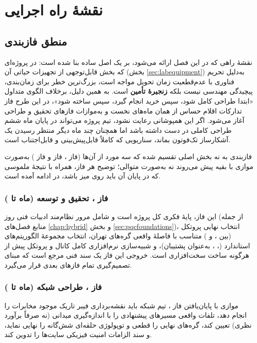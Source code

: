 \chapter{نقشهٔ راه اجرایی}
\label{chap:roadmap}

\section{منطق فازبندی}

نقشهٔ راهی که در این فصل ارائه می‌شود، بر یک اصل ساده بنا شده است: در پروژه‌ای که بخش قابل‌توجهی از تجهیزات حیاتی آن (بخش \ref{sec:labequipment}) به‌دلیل تحریم فناوری با عدم‌قطعیت زمان تحویل مواجه است، بزرگ‌ترین خطر برای زمان‌بندی، پیچیدگی مهندسی نیست بلکه \textbf{زنجیرهٔ تأمین} است. به همین دلیل، برخلاف الگوی متداول «ابتدا طراحی کامل شود، سپس خرید انجام گیرد، سپس ساخته شود»، در این طرح فاز تدارکات اقلام حساس از همان ماه‌های نخست و به‌موازات فازهای تحقیق و طراحی آغاز می‌شود. اگر این همپوشانی رعایت نشود، تیم پروژه می‌تواند در پایان ماه ششم طراحی کاملی در دست داشته باشد اما همچنان چند ماه دیگر منتظر رسیدن یک آشکارساز تک‌فوتون بماند، سناریویی که کاملاً قابل‌پیش‌بینی و قابل‌اجتناب است.

فازبندی به نه بخش اصلی تقسیم شده که سه مورد از آن‌ها (فاز ، فاز  و فاز ) به‌صورت موازی با بقیه پیش می‌روند نه به‌صورت متوالی؛ توضیح هر فاز، همراه با نتیجهٔ ملموسی که در پایان آن باید روی میز باشد، در ادامه آمده است.

\subsection*{فاز \texorpdfstring{}{۰}، تحقیق و توسعه (ماه \texorpdfstring{}{۱} تا \texorpdfstring{}{۳})}
این فاز، پایهٔ فکری کل پروژه است و شامل مرور نظام‌مند ادبیات فنی روز (از جمله منابع فصل‌های \ref{chap:hybrid} و بخش \ref{sec:pqcfoundations})، انتخاب نهایی پروتکل  (بین ،  و ) متناسب با فاصلهٔ واقعی گره‌های تهران، انتخاب مجموعهٔ الگوریتم‌های  استاندارد  (، ،  به‌عنوان پشتیبان)، و شبیه‌سازی نرم‌افزاری کامل کانال و پروتکل پیش از هرگونه ساخت سخت‌افزاری است. خروجی این فاز یک سند فنی مرجع است که مبنای تصمیم‌گیری تمام فازهای بعدی قرار می‌گیرد.

\subsection*{فاز \texorpdfstring{}{۱}، طراحی شبکه (ماه \texorpdfstring{}{۲} تا \texorpdfstring{}{۴})}
موازی با پایان‌یافتن فاز ، تیم شبکه باید نقشه‌برداری فیبر تاریک موجود مخابرات را انجام دهد، تلفات واقعی مسیرهای پیشنهادی را با اندازه‌گیری میدانی (نه صرفاً برآورد نظری) تعیین کند، گره‌های نهایی را قطعی و توپولوژی حلقه‌ای شش‌گانه را نهایی نماید، و سند الزامات امنیت فیزیکی سایت‌ها را تدوین کند.

